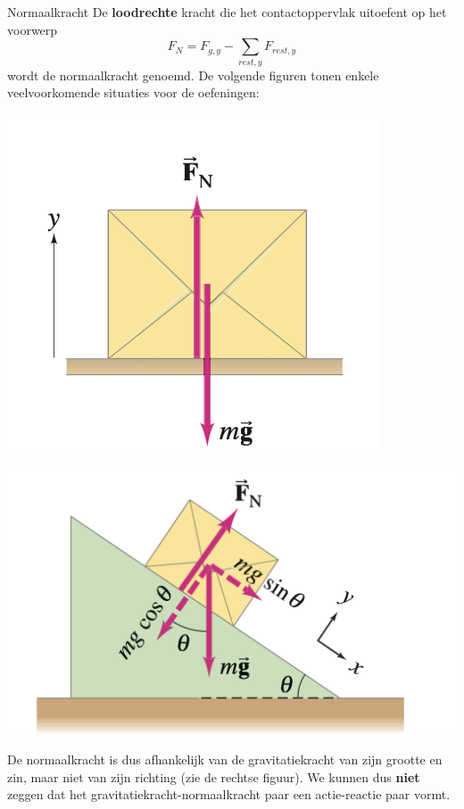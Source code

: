 \begin{theo}[Normaalkracht]{Normaalkracht}
    De \textbf{loodrechte} kracht die het contactoppervlak uitoefent op het voorwerp 
    \begin{equation*}
        F_N = F_{g,y} - \sum_{rest,y} F_{rest,y}
    \end{equation*}
    \noindent wordt de normaalkracht genoemd. De volgende figuren tonen enkele veelvoorkomende situaties voor de oefeningen:
    
    \begin{minipage}{.48\textwidth}
    
        \centering
        \includegraphics[scale = 0.7]{Images/Dynamica/Doos in rust.png}   
    
    \end{minipage} 
    \begin{minipage}{.48\textwidth}
    
        \centering
        \includegraphics[scale = 0.35]{Images/Dynamica/Glijdende doos.png}
        
    \end{minipage}
    
    \vspace{0.25cm}
    
    \noindent De normaalkracht is dus afhankelijk van de gravitatiekracht van zijn grootte en zin, maar niet van zijn richting (zie de rechtse figuur). We kunnen dus \textbf{niet} zeggen dat het gravitatiekracht-normaalkracht paar een actie-reactie paar vormt. 
\end{theo}


